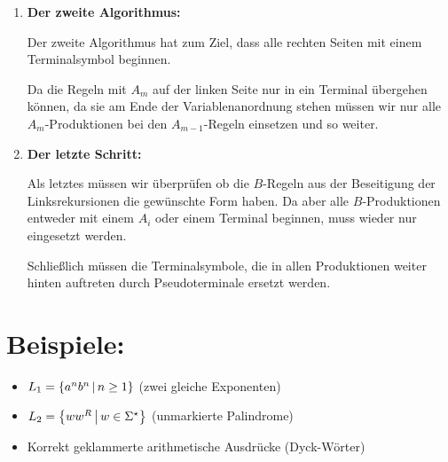 \begin{enumerate}
	\item \textbf{Der zweite Algorithmus:}

	Der zweite Algorithmus hat zum Ziel, dass alle rechten Seiten mit einem Terminalsymbol beginnen.

	Da die Regeln mit $A_m$ auf der linken Seite nur in ein Terminal übergehen können, da sie am Ende der Variablenanordnung stehen müssen wir nur alle $A_m$-Produktionen bei den $A_{m-1}$-Regeln einsetzen und so weiter.

	\item \textbf{Der letzte Schritt:}

	Als letztes müssen wir überprüfen ob die $B$-Regeln aus der Beseitigung der Linksrekursionen die gewünschte Form haben.
	Da aber alle $B$-Produktionen entweder mit einem $A_i$ oder einem Terminal beginnen, muss wieder nur eingesetzt werden.

	Schließlich müssen die Terminalsymbole, die in allen Produktionen weiter hinten auftreten durch Pseudoterminale ersetzt werden.
\end{enumerate}

\section{Beispiele: }
\begin{itemize}
	\item $L_1=\left\{ a^nb^n \,\middle|\, n\geq 1 \right\}$ (zwei gleiche Exponenten)
	\item $L_2=\left\{ ww^R \,\middle|\, w\in\Sigma^\star \right\}$ (unmarkierte Palindrome)
	\item Korrekt geklammerte arithmetische Ausdrücke (Dyck-Wörter)
\end{itemize}
